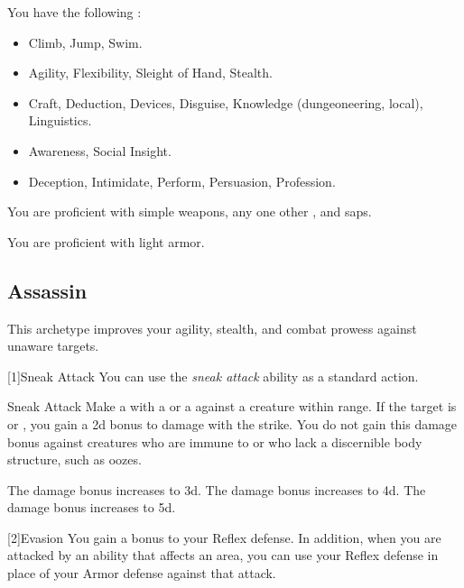         You have the following :
        \begin{itemize}
            \item {} Climb, Jump, Swim.
            \item {} Agility, Flexibility, Sleight of Hand, Stealth.
            \item {} Craft, Deduction, Devices, Disguise, Knowledge (dungeoneering, local), Linguistics.
            \item {} Awareness, Social Insight.
            \item {} Deception, Intimidate, Perform, Persuasion, Profession.
        \end{itemize}

        You are proficient with simple weapons, any one other , and saps.

        You are proficient with light armor.

    \subsection{Assassin}
        This archetype improves your agility, stealth, and combat prowess against unaware targets.

        [1]{Sneak Attack} You can use the \textit{sneak attack} ability as a standard action.
        \begin{freeability}{Sneak Attack}
            Make a  with a  or a  against a creature within \rngclose range.
            If the target is \unaware or , you gain a \plus2d bonus to damage with the strike.
            You do not gain this damage bonus against creatures who are immune to  or who lack a discernible body structure, such as oozes.

            \rankline
             The damage bonus increases to \plus3d.
             The damage bonus increases to \plus4d.
             The damage bonus increases to \plus5d.
        \end{freeability}

        [2]{Evasion} You gain a  bonus to your Reflex defense.
        In addition, when you are attacked by an ability that affects an area, you can use your Reflex defense in place of your Armor defense against that attack.

